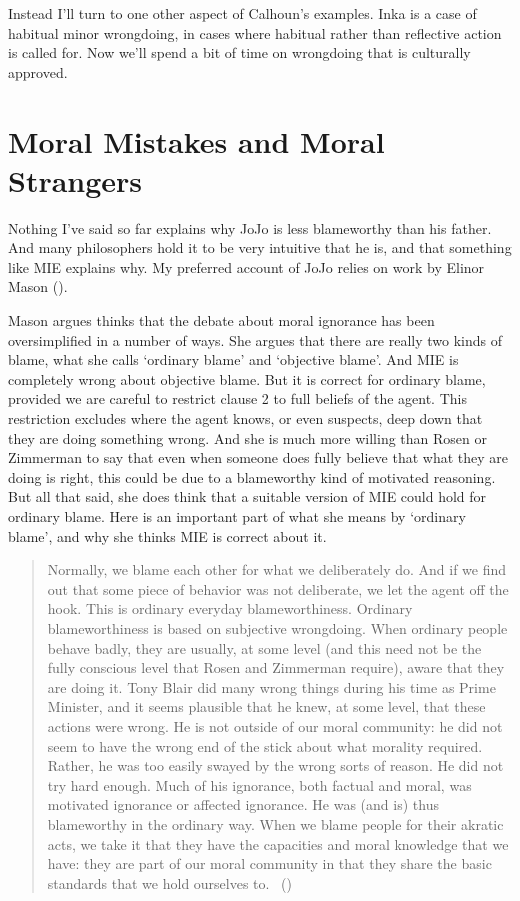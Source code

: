 \documentclass[
  10pt,
  letterpaper,
  twoside]{scrbook}
\begin{document}
Instead I'll turn to one other aspect of Calhoun's examples. {Inka} is a
case of habitual minor wrongdoing, in cases where habitual rather than
reflective action is called for. Now we'll spend a bit of time on
wrongdoing that is culturally approved.

\section{Moral Mistakes and Moral
Strangers}\label{moralmistakesandmoralstrangers}

Nothing I've said so far explains why {JoJo} is less blameworthy than
his father. And many philosophers hold it to be very intuitive that he
is, and that something like MIE explains why. My preferred account of
{JoJo} relies on work by Elinor Mason ().

Mason argues thinks that the debate about moral ignorance has been
oversimplified in a number of ways. She argues that there are really two
kinds of blame, what she calls `ordinary blame' and `objective blame'.
And MIE is completely wrong about objective blame. But it is correct for
ordinary blame, provided we are careful to restrict clause 2 to full
beliefs of the agent. This restriction excludes where the agent knows,
or even suspects, deep down that they are doing something wrong. And she
is much more willing than Rosen or Zimmerman to say that even when
someone does fully believe that what they are doing is right, this could
be due to a blameworthy kind of motivated reasoning. But all that said,
she does think that a suitable version of MIE could hold for ordinary
blame. Here is an important part of what she means by `ordinary blame',
and why she thinks MIE is correct about it.

\begin{quote}
Normally, we blame each other for what we deliberately do. And if we
find out that some piece of behavior was not deliberate, we let the
agent off the hook. This is ordinary everyday blameworthiness. Ordinary
blameworthiness is based on subjective wrongdoing. When ordinary people
behave badly, they are usually, at some level (and this need not be the
fully conscious level that Rosen and Zimmerman require), aware that they
are doing it. Tony Blair did many wrong things during his time as Prime
Minister, and it seems plausible that he knew, at some level, that these
actions were wrong. He is not outside of our moral community: he did not
seem to have the wrong end of the stick about what morality required.
Rather, he was too easily swayed by the wrong sorts of reason. He did
not try hard enough. Much of his ignorance, both factual and moral, was
motivated ignorance or affected ignorance. He was (and is) thus
blameworthy in the ordinary way. When we blame people for their akratic
acts, we take it that they have the capacities and moral knowledge that
we have: they are part of our moral community in that they share the
basic standards that we hold ourselves to.
~()
\end{quote}
\end{document}
